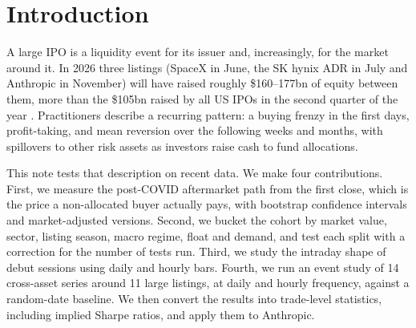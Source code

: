 \documentclass[11pt]{article}
\begin{document}
\vspace{0.6em}
\noindent{}

\section{Introduction}

A large IPO is a liquidity event for its issuer and, increasingly, for the market around it. In 2026 three listings (SpaceX in June, the SK hynix ADR in July and Anthropic in November) will have raised roughly \$160--177bn of equity between them, more than the \$105bn raised by all US IPOs in the second quarter of the year \citep{renaissance2026}. Practitioners describe a recurring pattern: a buying frenzy in the first days, profit-taking, and mean reversion over the following weeks and months, with spillovers to other risk assets as investors raise cash to fund allocations.

This note tests that description on recent data. We make four contributions. First, we measure the post-COVID aftermarket path from the first close, which is the price a non-allocated buyer actually pays, with bootstrap confidence intervals and market-adjusted versions. Second, we bucket the cohort by market value, sector, listing season, macro regime, float and demand, and test each split with a correction for the number of tests run. Third, we study the intraday shape of debut sessions using daily and hourly bars. Fourth, we run an event study of 14 cross-asset series around 11 large listings, at daily and hourly frequency, against a random-date baseline. We then convert the results into trade-level statistics, including implied Sharpe ratios, and apply them to Anthropic.
\end{document}

